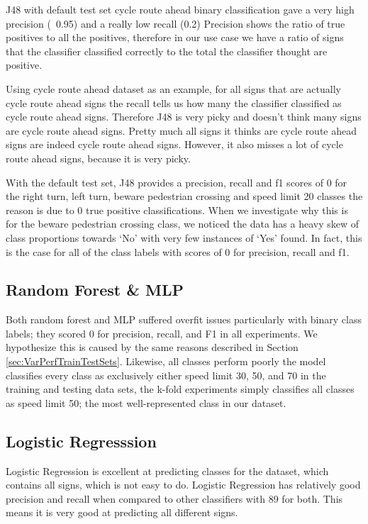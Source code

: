\documentclass[11pt]{article}
\begin{document}
J48 with default test set cycle route ahead binary classification gave a very high precision (~0.95) and a really low recall (0.2) 
Precision shows the ratio of true positives to all the positives, therefore in our use case we have a ratio of signs that the classifier classified correctly to the total the classifier thought are positive. 
\par
Using cycle route ahead dataset as an example, for all signs that are actually cycle route ahead signs the recall tells us how many the classifier classified as cycle route ahead  signs. 
Therefore J48 is very picky and doesn't think many signs are cycle route ahead signs. Pretty much all signs it thinks are cycle route ahead signs are indeed cycle route ahead signs. However, it also misses a lot of cycle route ahead signs, because it is very picky.
\par
With the default test set, J48 provides a precision, recall and f1 scores of 0 for the right turn, left turn, beware pedestrian crossing and speed limit 20 classes the reason is due to 0 true positive classifications. When we investigate why this is for the beware pedestrian crossing class, we noticed the data has a heavy skew of class proportions towards ‘No’ with very few instances of ‘Yes’ found. In fact, this is the case for all of the class labels with scores of 0 for precision, recall and f1.

\subsection{Random Forest \& MLP}
Both random forest and MLP suffered overfit issues particularly with binary class labels; they scored 0 for precision, recall, and F1 in all experiments. We hypothesize this is caused by the same reasons described in Section \ref{sec:VarPerfTrainTestSets}. Likewise, all classes perform poorly the model classifies every class as exclusively either speed limit 30, 50, and 70 in the training and testing data sets, the k-fold experiments simply classifies all classes as speed limit 50; the most well-represented class in our dataset. 

\subsection{Logistic Regresssion}
Logistic Regression is excellent at predicting classes for the dataset, which contains all signs, which is not easy to do. Logistic Regression has relatively good precision and recall when compared to other classifiers with 89 for both. This means it is very good at predicting all different signs.
\end{document}

